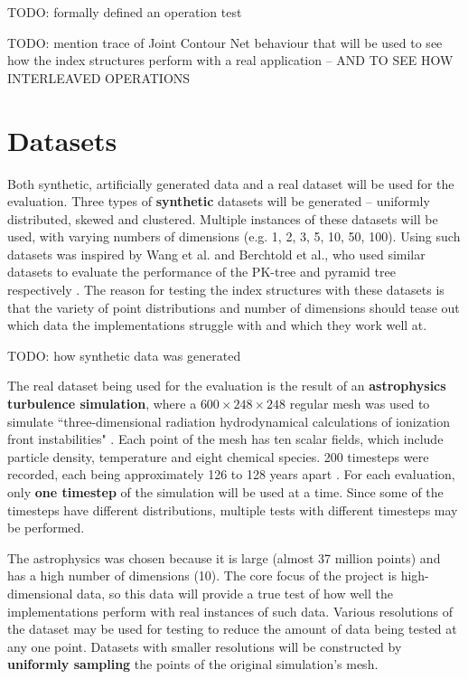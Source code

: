 TODO: formally defined an operation test

TODO: mention trace of Joint Contour Net behaviour that will be used to see how the index structures perform with a real application -- AND TO SEE HOW INTERLEAVED OPERATIONS 

\section{Datasets}
\label{sec:datasets}

Both synthetic, artificially generated data and a real dataset will be used for the evaluation. Three types of \textbf{synthetic} datasets will be generated -- uniformly distributed, skewed and clustered. Multiple instances of these datasets will be used, with varying numbers of dimensions (e.g. 1, 2, 3, 5, 10, 50, 100). Using such datasets was inspired by Wang et al. and Berchtold et al., who used similar datasets to evaluate the performance of the PK-tree and pyramid tree respectively \cite{pk-tree, pyramid-tree}. The reason for testing the index structures with these datasets is that the variety of point distributions and number of dimensions should tease out which data the implementations struggle with and which they work well at.

TODO: how synthetic data was generated

The real dataset being used for the evaluation is the result of an \textbf{astrophysics turbulence simulation}, where a $600 \times 248 \times 248$ regular mesh was used to simulate ``three-dimensional radiation hydrodynamical calculations of ionization front instabilities" \cite{astrophysics-dataset}. Each point of the mesh has ten scalar fields, which include particle density, temperature and eight chemical species. 200 timesteps were recorded, each being approximately 126 to 128 years apart \cite{astrophysics-dataset}. For each evaluation, only \textbf{one timestep} of the simulation will be used at a time. Since some of the timesteps have different distributions, multiple tests with different timesteps may be performed.

The astrophysics was chosen because it is large (almost 37 million points) and has a high number of dimensions (10). The core focus of the project is high-dimensional data, so this data will provide a true test of how well the implementations perform with real instances of such data. Various resolutions of the dataset may be used for testing to reduce the amount of data being tested at any one point. Datasets with smaller resolutions will be constructed by \textbf{uniformly sampling} the points of the original simulation's mesh.

